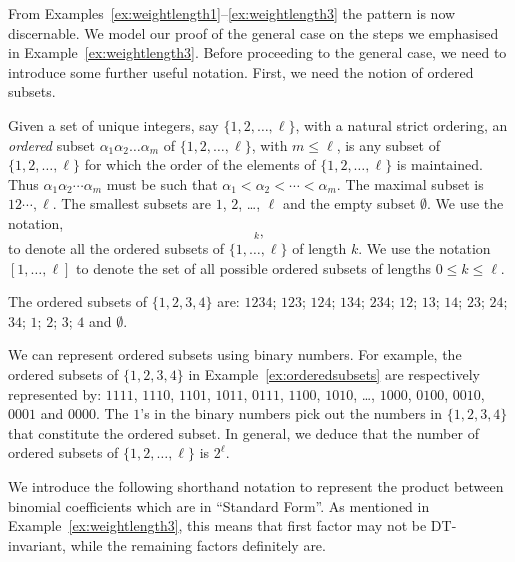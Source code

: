 \documentclass[5p,twocolumn]{elsarticle}
\begin{document}
From Examples~\ref{ex:weightlength1}--\ref{ex:weightlength3} the pattern is now discernable.
We model our proof of the general case on the steps we emphasised in Example~\ref{ex:weightlength3}. 
Before proceeding to the general case, we need to introduce some further useful notation.
First, we need the notion of ordered subsets.
%
\begin{definition}\label{def:orderedsubsets}
  Given a set of unique integers, say $\{1,2,\ldots,\ell\}$, with a natural strict ordering, an \emph{ordered} subset $\alpha_1\alpha_2\ldots\alpha_m$ of $\{1,2,\ldots,\ell\}$,
  with $m\leqslant\ell$, is any subset of $\{1,2,\ldots,\ell\}$ for which the order of the elements of $\{1,2,\ldots,\ell\}$ is maintained.
  Thus $\alpha_1\alpha_2\cdots\alpha_m$ must be such that $\alpha_1<\alpha_2<\cdots<\alpha_m$.
  The maximal subset is $12\cdots,\ell$. The smallest subsets are $1$, $2$, \ldots, $\ell$ and the empty subset $\emptyset$.
  We use the notation,
  \begin{equation*}
    [1,\ldots,\ell]_{k},
  \end{equation*}
  to denote all the ordered subsets of $\{1,\ldots,\ell\}$ of length $k$.
  We use the notation $[1,\ldots,\ell]$ to denote the set of all possible ordered subsets of lengths $0\leqslant k\leqslant\ell$.
\end{definition}
%
\begin{example}\label{ex:orderedsubsets}
The ordered subsets of $\{1,2,3,4\}$ are: $1234$; $123$; $124$; $134$; $234$; $12$; $13$; $14$; $23$; $24$; $34$; $1$; $2$; $3$; $4$ and $\emptyset$. 
\end{example}
%
\begin{example}\label{ex:orderedsetsbinary}
  We can represent ordered subsets using binary numbers. For example, the ordered subsets of $\{1,2,3,4\}$ in Example~\ref{ex:orderedsubsets} are respectively represented by:
  $1111$, $1110$, $1101$, $1011$, $0111$, $1100$, $1010$, \ldots, $1000$, $0100$, $0010$, $0001$ and $0000$. The $1$'s in the binary numbers pick out the numbers in $\{1,2,3,4\}$
  that constitute the ordered subset. In general, we deduce that the number of ordered subsets of $\{1,2,\ldots,\ell\}$ is $2^\ell$.
\end{example}
%
We introduce the following shorthand notation to represent the product between binomial coefficients which are in ``Standard Form''. 
As mentioned in Example~\ref{ex:weightlength3}, this means that first factor may not be DT-invariant, while the remaining factors definitely are.
\end{document}
